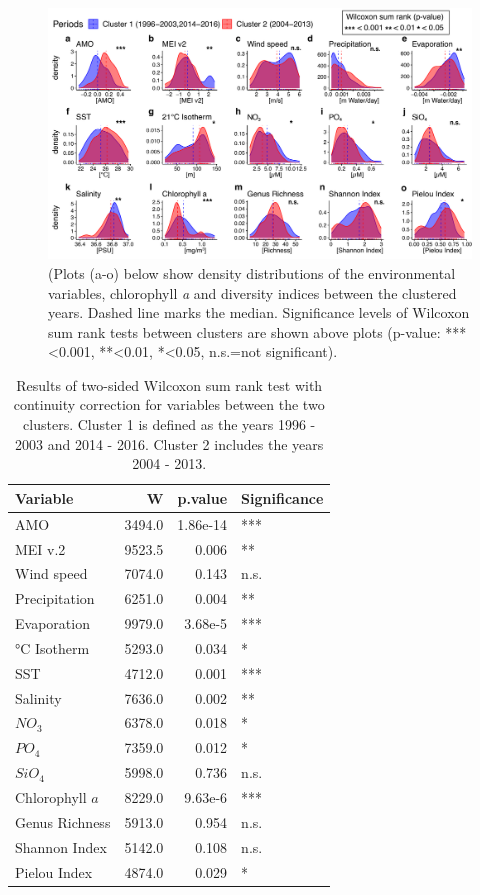 \documentclass[draft]{agujournal2019}
\begin{document}
\begin{figure}
\noindent\includegraphics[width=\textwidth]{fig/Figure5_ClustCompPlot_v2.pdf}
\caption{(Plots (a-o) below show density distributions of the environmental variables, chlorophyll \textit{a} and diversity indices between the clustered years. Dashed line marks the median. Significance levels of Wilcoxon sum rank tests between clusters are shown above plots  (p-value: ***\textless0.001, **\textless0.01, *\textless0.05, n.s.=not significant).}
\label{fig:clustcomp}
\end{figure}




\begin{table}

\caption{Results of two-sided Wilcoxon sum rank test with continuity correction for variables between the two clusters. Cluster 1 is defined as the years 1996 - 2003 and 2014 - 2016. Cluster 2 includes the years 2004 - 2013.}
\centering
\begin{tabular}[t]{lrrl}
\toprule
Variable & W & p.value & Significance\\
\midrule
AMO & 3494.0 & 1.86e-14 & ***\\
MEI v.2 & 9523.5 & 0.006 & **\\
Wind speed & 7074.0 & 0.143 & n.s.\\
Precipitation & 6251.0 & 0.004 & **\\
Evaporation & 9979.0 & 3.68e-5 & ***\\
\addlinespace
21 °C Isotherm & 5293.0 & 0.034 & *\\
SST & 4712.0 & 0.001 & ***\\
Salinity & 7636.0 & 0.002 & **\\
$NO_3$ & 6378.0 & 0.018 & *\\
$PO_4$ & 7359.0 & 0.012 & *\\
$SiO_4$ & 5998.0 & 0.736 & n.s.\\
\addlinespace
Chlorophyll $a$ & 8229.0 & 9.63e-6 & ***\\
Genus Richness & 5913.0 & 0.954 & n.s.\\
Shannon Index & 5142.0 & 0.108 & n.s.\\
Pielou Index & 4874.0 & 0.029 & *\\
\bottomrule
\end{tabular}
\end{table}
\end{document}

